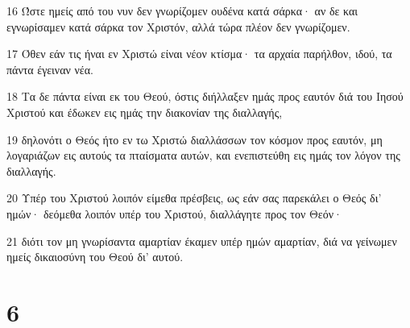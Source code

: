 \par 16 Ώστε ημείς από του νυν δεν γνωρίζομεν ουδένα κατά σάρκα· αν δε και εγνωρίσαμεν κατά σάρκα τον Χριστόν, αλλά τώρα πλέον δεν γνωρίζομεν.
\par 17 Όθεν εάν τις ήναι εν Χριστώ είναι νέον κτίσμα· τα αρχαία παρήλθον, ιδού, τα πάντα έγειναν νέα.
\par 18 Τα δε πάντα είναι εκ του Θεού, όστις διήλλαξεν ημάς προς εαυτόν διά του Ιησού Χριστού και έδωκεν εις ημάς την διακονίαν της διαλλαγής,
\par 19 δηλονότι ο Θεός ήτο εν τω Χριστώ διαλλάσσων τον κόσμον προς εαυτόν, μη λογαριάζων εις αυτούς τα πταίσματα αυτών, και ενεπιστεύθη εις ημάς τον λόγον της διαλλαγής.
\par 20 Υπέρ του Χριστού λοιπόν είμεθα πρέσβεις, ως εάν σας παρεκάλει ο Θεός δι' ημών· δεόμεθα λοιπόν υπέρ του Χριστού, διαλλάγητε προς τον Θεόν·
\par 21 διότι τον μη γνωρίσαντα αμαρτίαν έκαμεν υπέρ ημών αμαρτίαν, διά να γείνωμεν ημείς δικαιοσύνη του Θεού δι' αυτού.

\chapter{6}

